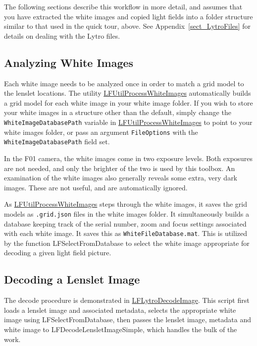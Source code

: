 \documentclass[onecolumn]{article}
\newcommand{\CiteFunction}[1]{\hyperlink{#1}{\small #1}}
\newcommand{\SupFunction}[1]{{\small #1}}
\newcommand{\SymbolText}[1]{\texttt{\small #1}}
\begin{document}
The following sections describe this workflow in more detail, and assumes that you have extracted the white images and copied light fields into a folder structure similar to that used in the quick tour, above. See Appendix~\ref{sect_LytroFiles} for details on dealing with the Lytro files.

\subsection{Analyzing White Images}
\label{sect_AnalyzingWhiteImages}
Each white image needs to be analyzed once in order to match a grid model to the lenslet locations. The utility \CiteFunction{LFUtilProcessWhiteImages} automatically builds a grid model for each white image in your white image folder. If you wish to store your white images in a structure other than the default, simply change the \SymbolText{WhiteImageDatabasePath} variable in \CiteFunction{LFUtilProcessWhiteImages} to point to your white images folder, or pass an argument \SymbolText{FileOptions} with the \SymbolText{WhiteImageDatabasePath} field set.

In the F01 camera, the white images come in two exposure levels. Both exposures are not needed, and only the brighter of the two is used by this toolbox. An examination of the white images also generally reveals some extra, very dark images. These are not useful, and are automatically ignored.

As \CiteFunction{LFUtilProcessWhiteImages} steps through the white images, it saves the grid models as \SymbolText{.grid.json} files in the white images folder. It simultaneously builds a database keeping track of the serial number, zoom and focus settings associated with each white image. It saves this as \SymbolText{WhiteFileDatabase.mat}.  This is utilized by the function \SupFunction{LFSelectFromDatabase} to select the white image appropriate for decoding a given light field picture.

\subsection{Decoding a Lenslet Image}

The decode procedure is demonstrated in \CiteFunction{LFLytroDecodeImage}. This script first loads a lenslet image and associated metadata, selects the appropriate white image using \SupFunction{LFSelectFromDatabase}, then passes the lenslet image, metadata and white image to \SupFunction{LFDecodeLensletImageSimple}, which handles the bulk of the work.
\end{document}
